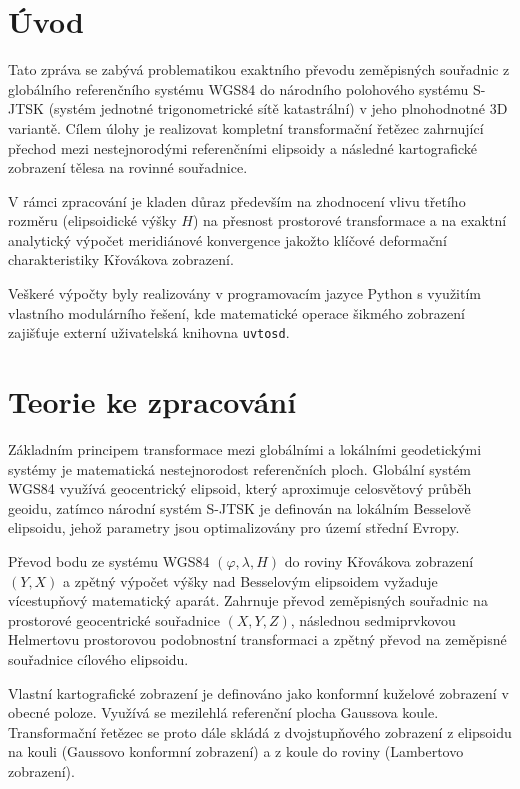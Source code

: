 \section*{Úvod}
Tato zpráva se zabývá problematikou exaktního převodu zeměpisných souřadnic z globálního referenčního systému WGS84 do národního polohového systému S-JTSK (systém jednotné trigonometrické sítě katastrální) v jeho plnohodnotné 3D variantě. Cílem úlohy je realizovat kompletní transformační řetězec zahrnující přechod mezi nestejnorodými referenčními elipsoidy a následné kartografické zobrazení tělesa na rovinné souřadnice.

V rámci zpracování je kladen důraz především na zhodnocení vlivu třetího rozměru (elipsoidické výšky $H$) na přesnost prostorové transformace a na exaktní analytický výpočet meridiánové konvergence jakožto klíčové deformační charakteristiky Křovákova zobrazení. 

Veškeré výpočty byly realizovány v programovacím jazyce Python s využitím vlastního modulárního řešení, kde matematické operace šikmého zobrazení zajišťuje externí uživatelská knihovna \lstinline|uvtosd|.

\newpage
\section*{Teorie ke zpracování}  
Základním principem transformace mezi globálními a lokálními geodetickými systémy je matematická nestejnorodost referenčních ploch. Globální systém WGS84 využívá geocentrický elipsoid, který aproximuje celosvětový průběh geoidu, zatímco národní systém S-JTSK je definován na lokálním Besselově elipsoidu, jehož parametry jsou optimalizovány pro území střední Evropy.

Převod bodu ze systému WGS84 $(\varphi, \lambda, H)$ do roviny Křovákova zobrazení $(Y, X)$ a zpětný výpočet výšky nad Besselovým elipsoidem vyžaduje vícestupňový matematický aparát. Zahrnuje převod zeměpisných souřadnic na prostorové geocentrické souřadnice $(X, Y, Z)$, následnou sedmiprvkovou Helmertovu prostorovou podobnostní transformaci a zpětný převod na zeměpisné souřadnice cílového elipsoidu.

Vlastní kartografické zobrazení je definováno jako konformní kuželové zobrazení v obecné poloze. Využívá se mezilehlá referenční plocha Gaussova koule. Transformační řetězec se proto dále skládá z dvojstupňového zobrazení z elipsoidu na kouli (Gaussovo konformní zobrazení) a z koule do roviny (Lambertovo zobrazení).

